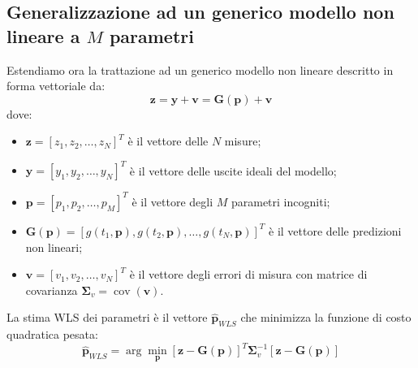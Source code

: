 \subsection{Generalizzazione ad un generico modello non lineare a $M$ parametri}

Estendiamo ora la trattazione ad un generico modello non lineare descritto in forma vettoriale da:
\begin{equation}
\mathbf{z} = \mathbf{y} + \mathbf{v} = \mathbf{G}(\mathbf{p}) + \mathbf{v}
\end{equation}
dove:
\begin{itemize}
    \item $\mathbf{z} = [z_{1}, z_{2}, \dots, z_{N}]^{T}$ è il vettore delle $N$ misure;
    \item $\mathbf{y} = [y_{1}, y_{2}, \dots, y_{N}]^{T}$ è il vettore delle uscite ideali del modello;
    \item $\mathbf{p} = [p_{1}, p_{2}, \dots, p_{M}]^{T}$ è il vettore degli $M$ parametri incogniti;
    \item $\mathbf{G}(\mathbf{p}) = [g(t_{1}, \mathbf{p}), g(t_{2}, \mathbf{p}), \dots, g(t_{N}, \mathbf{p})]^{T}$ è il vettore delle predizioni non lineari;
    \item $\mathbf{v} = [v_{1}, v_{2}, \dots, v_{N}]^{T}$ è il vettore degli errori di misura con matrice di covarianza $\mathbf{\Sigma}_{v} = \operatorname{cov}(\mathbf{v})$.
\end{itemize}

La stima WLS dei parametri è il vettore $\hat{\mathbf{p}}_{WLS}$ che minimizza la funzione di costo quadratica pesata:
\begin{equation}
\hat{\mathbf{p}}_{WLS} = \arg\min_{\mathbf{p}} [\mathbf{z} - \mathbf{G}(\mathbf{p})]^{T}\mathbf{\Sigma}_{v}^{-1}[\mathbf{z} - \mathbf{G}(\mathbf{p})]
\end{equation}

